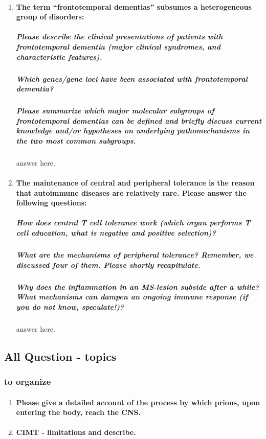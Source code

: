 \documentclass[12pt,article,oneside,a4paper]{memoir}
\begin{document}
\begin{enumerate}
\item \paragraph{The term ``frontotemporal dementias'' subsumes a heterogeneous group of disorders:}
\subparagraph{Please describe the clinical presentations of patients with frontotemporal dementia (major clinical syndromes, and characteristic features).} \subparagraph{Which genes/gene loci have been associated with frontotemporal dementia?} \subparagraph{Please summarize which major molecular subgroups of frontotemporal dementias can be defined and briefly discuss current knowledge and/or hypotheses on underlying pathomechanisms in the two most common subgroups.} answer here.

\item \paragraph{The maintenance of central and peripheral tolerance is the reason that autoimmune diseases are relatively rare. Please answer the following questions:} \subparagraph{How does central T cell tolerance work (which organ performs T cell education, what is negative and positive selection)?} \subparagraph{What are the mechanisms of peripheral tolerance? Remember, we discussed four of them. Please shortly recapitulate.} \subparagraph{Why does the inflammation in an MS-lesion subside after a while? What mechanisms can dampen an ongoing immune response (if you do not know,
speculate!)?} answer here.

\end{enumerate}

\subsection{All Question - topics}
\subsubsection{to organize}
\begin{enumerate}
\item \paragraph{Please give a detailed account of the process by which prions, upon entering the body, reach the CNS.}
\item \paragraph{CIMT - limitations and describe.}
\end{enumerate}
\end{document}
